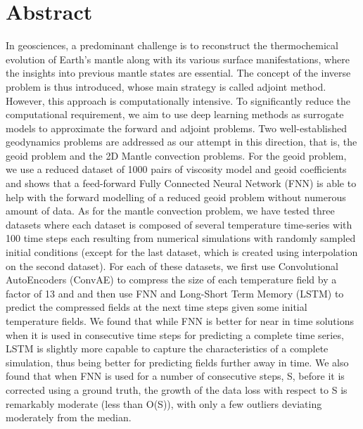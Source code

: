 \chapter*{Abstract}
In geosciences, a predominant challenge is to reconstruct the thermochemical evolution of Earth's mantle along with its various surface manifestations, where the insights into previous mantle states are essential. The concept of the inverse problem is thus introduced, whose main strategy is called adjoint method. However, this approach is computationally intensive. To significantly reduce the computational requirement, we aim to use deep learning methods as surrogate models to approximate the forward and adjoint problems. Two well-established geodynamics problems are addressed as our attempt in this direction, that is, the geoid problem and the 2D Mantle convection problems. For the geoid problem, we use a reduced dataset of 1000 pairs of viscosity model and geoid coefficients and shows that a feed-forward Fully Connected Neural Network (FNN) is able to help with the forward modelling of a reduced geoid problem without numerous amount of data. As for the mantle convection problem, we have tested three datasets where each dataset is composed of several temperature time-series with 100 time steps each resulting from numerical simulations with randomly sampled initial conditions (except for the last dataset, which is created using interpolation on the second dataset). For each of these datasets, we first use Convolutional AutoEncoders (ConvAE) to compress the size of each temperature field by a factor of 13 and and then use FNN and Long-Short Term Memory (LSTM) to predict the compressed fields at the next time steps given some initial temperature fields. We found that while FNN is better for near in time solutions when it is used in consecutive time steps for predicting a complete time series, LSTM is slightly more capable to capture the characteristics of a complete simulation, thus being better for predicting fields further away in time. We also found that when FNN is used for a number of consecutive steps, S, before it is corrected using a ground truth, the growth of the data loss with respect to S is remarkably moderate (less than O(S)), with only a few outliers deviating moderately from the median.